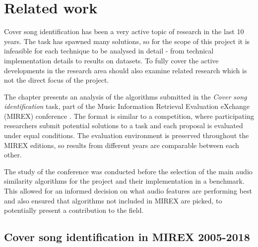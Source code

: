 
\chapter{Related work}
\label{chap:relatedwork}
\ifpdf
    \graphicspath{{RelatedWork/Figures/PNG/}{RelatedWork/Figures/PDF/}{RelatedTerminology/Figures/}}
\else
    \graphicspath{{RelatedWork/Figures/EPS/}{RelatedWork/Figures/}}
\fi




Cover song identification has been a very active topic of research in the last
10 years. The task has spawned many solutions, so for the scope of this project
it is infeasible for each technique to be analysed in detail - from technical
implementation details to results on datasets. To fully cover the active
developments in the research area should also examine related
research which is not the direct focus of the project.

The chapter presents an analysis of the algorithms submitted in the
\textit{Cover song identification} task, part of the Music Information Retrieval
Evaluation eXchange (MIREX) conference \cite{mirex}. The format is similar to a
competition, where participating researchers submit potential solutions to a
task and each proposal is evaluated under equal conditions. The evaluation
environment is preserved throughout the MIREX editions, so results from
different years are comparable between each other.

The study of the conference was conducted before the selection of the main
audio similarity algorithms for the project and their implementation in a
benchmark. This allowed for an informed decision on what audio features are
performing best and also ensured that algorithms not included in MIREX are
picked, to potentially present a contribution to the field.

\section{Cover song identification in MIREX 2005-2018}
\label{sec:scientificpaper}

